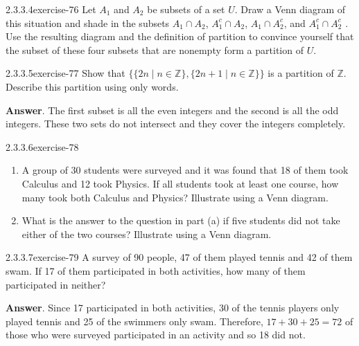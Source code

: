 \documentclass[twoside,10pt,]{book}
\numberwithin{equation}{section}
\begin{document}
\begin{divisionsolution}{2.3.3.4}{}{exercise-76}%
\hypertarget{p-749}{}%
Let \(A_1\) and \(A_2\) be subsets of a set \(U\).   Draw a Venn diagram of this situation and shade in the subsets \(A_1 \cap A_2\), \(A_1^c \cap A_2\), \(A_1 \cap A_2^c\), and \(A_1^c \cap A_2^c\) . Use the resulting diagram and the definition of partition to convince yourself that the subset of these four subsets that are nonempty form a partition of \(U\).%
\end{divisionsolution}%
\begin{divisionsolution}{2.3.3.5}{}{exercise-77}%
\hypertarget{p-750}{}%
Show that \(\{\{2 n \mid n \in \mathbb{Z}\}, \{2 n + 1 \mid n \in \mathbb{Z}\}\}\) is a partition of \(\mathbb{Z}\). Describe this partition using only words.%
\par\smallskip%
\noindent\textbf{Answer}.\quad%
\hypertarget{p-751}{}%
The first subset is all the even integers and the second is all the odd integers. These two sets do not intersect and they cover the integers completely.%
\end{divisionsolution}%
\begin{divisionsolution}{2.3.3.6}{}{exercise-78}%
\hypertarget{p-752}{}%
\leavevmode%
\begin{enumerate}[label=(\alph*)]
\item\hypertarget{li-452}{}\hypertarget{p-753}{}%
A group of 30 students were surveyed and it was found that 18 of them took Calculus and 12 took Physics. If all students took at least one course, how many took both Calculus and Physics? Illustrate using a Venn diagram.%
\item\hypertarget{li-453}{}\hypertarget{p-754}{}%
What is the answer to the question in part (a) if five students did not take either of the two courses? Illustrate using a Venn diagram.%
\end{enumerate}
%
\end{divisionsolution}%
\begin{divisionsolution}{2.3.3.7}{}{exercise-79}%
\hypertarget{p-755}{}%
A survey of 90 people, 47 of them played tennis and 42 of them swam. If 17 of them participated in both activities, how many of them participated in neither?%
\par\smallskip%
\noindent\textbf{Answer}.\quad%
\hypertarget{p-756}{}%
Since 17 participated in both activities, 30 of the tennis players only played tennis and 25 of the swimmers only swam. Therefore, \(17+30+25=72\) of those who were surveyed participated in an activity and so 18 did not.%
\end{divisionsolution}%
\end{document}
